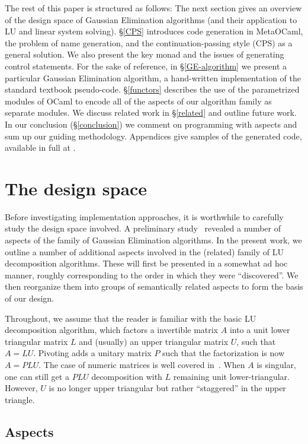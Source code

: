 \documentclass{elsart}
\begin{document}
The rest of this paper is structured as follows: The next section
gives an overview of the design space of Gaussian Elimination algorithms
(and their application to LU and linear system solving).
\S\ref{CPS}
introduces code generation in MetaOCaml, the problem of name
generation, and the continuation-passing style (CPS) as a general
solution.  We also present the key monad and the issues of generating
control statements. For the sake of reference, in \S\ref{GE-algorithm} 
we present a particular Gaussian Elimination algorithm,
a hand-written implementation of the standard textbook pseudo-code.
\S\ref{functors} describes the use of
the parametrized modules of OCaml to encode all of the aspects of our
algorithm family as separate modules.  We discuss related work in
\S\ref{related} and outline future work. In our
conclusion (\S\ref{conclusion}) we comment
on programming with aspects and sum up our guiding methodology.
Appendices give samples of the generated code, available in
full at \cite{metamonadsURL}.

\section{The design space}\label{design}

Before investigating implementation approaches, it is worthwhile to
carefully study the design space involved.  A preliminary
study~\cite{Carette06} revealed a number of aspects of the family of
Gaussian Elimination algorithms.  In the present work, we outline a
number of additional aspects involved in the (related) family of LU
decomposition algorithms.  These will first be presented in a somewhat
ad hoc manner, roughly corresponding to the order in which they were
``discovered''.  We then reorganize them into groups of
semantically related aspects to form the basis of our design.

Throughout, we assume that the reader is familiar with the basic LU
decomposition algorithm, which factors a invertible matrix $A$ into a unit
lower triangular matrix $L$ and (usually) an upper triangular matrix $U$,
such that $A = LU$.  Pivoting adds a unitary matrix $P$ such
that the factorization is now $A = PLU$.  The case of numeric matrices is well
covered in~\cite{Golub-vanLoan}.  When $A$ is singular, one can still get
a $PLU$ decomposition with $L$ remaining unit lower-triangular. However, 
$U$ is no longer upper triangular but rather ``staggered''
in the upper triangle.

\subsection{Aspects}\label{sec:aspects}
\end{document}
